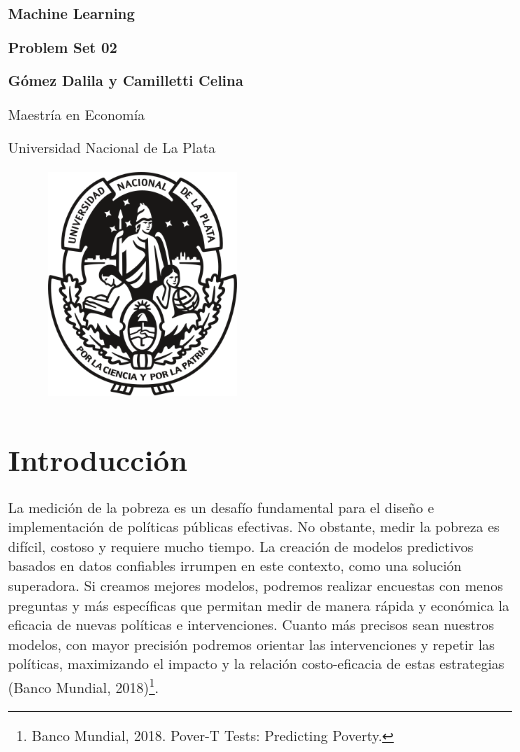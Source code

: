 \documentclass[11pt, a4paper]{article}
\begin{document}
\begin{titlepage}
    \centering
    \vspace*{2cm}
    {\huge\bfseries Machine Learning  \par}
    \vspace{0.5cm}

    {\huge\bfseries Problem Set 02  \par}
    \vspace{0.5cm}
    \vspace{0.5cm}
    {\huge\bfseries\par}
    \vspace{3cm}
    
    {\Large \textbf{Gómez Dalila y Camilletti Celina} \par}
    {\large Maestría en Economía \par}
    {\large Universidad Nacional de La Plata}
    \vspace{1cm}
  
  \begin{figure}[H]
    \centering
    \captionsetup{justification=centering}
    \includegraphics[width=5cm]{../Views/UNLP_Logo_(cropped).svg.png}
\end{figure}
\end{titlepage}


\section{Introducción}


La medición de la pobreza es un desafío fundamental para el diseño e implementación de políticas públicas efectivas. No obstante, medir la pobreza es difícil, costoso y requiere mucho tiempo. La creación de modelos predictivos basados en datos confiables irrumpen en este contexto, como una solución superadora. Si creamos mejores modelos, podremos realizar encuestas con menos preguntas y más específicas que permitan medir de manera rápida y económica
la eficacia de nuevas políticas e intervenciones. Cuanto más precisos sean nuestros modelos, con mayor precisión podremos orientar las intervenciones y repetir las políticas, maximizando el impacto y la relación costo-eficacia de estas estrategias (Banco Mundial, 2018)\footnote{Banco Mundial, 2018. Pover-T Tests: Predicting Poverty.}. 
\end{document}
